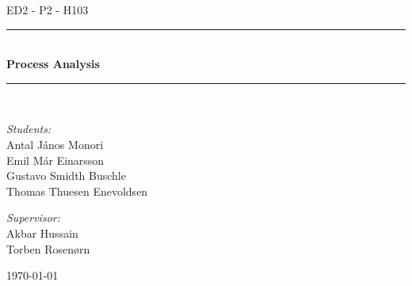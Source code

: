 \newcommand{\HRule}{\rule{\linewidth}{0.5 mm}}
\begin{titlepage}

\begin{center}
\textsc{\Large ED2 - P2 - H103}\\[0.6cm]

\HRule \\[0.9cm]
{ \Huge \bfseries Process Analysis}\\[0.4cm]

\HRule \\[0.5cm]


\begin{minipage}{0.49\textwidth}
\begin{flushleft} \large
\emph{Students:}\\
Antal János Monori\\
Emil Már Einarsson\\
Gustavo Smidth Buschle\\
Thomas Thuesen Enevoldsen
\end{flushleft}
\end{minipage}
\begin{minipage}{0.49\textwidth}
\begin{flushright} \large
\emph{Supervisor:} \\
Akbar Hussain\\
Torben Rosenørn
\end{flushright}
\end{minipage}

\vfill

{\large \today}



\end{center}

\end{titlepage}